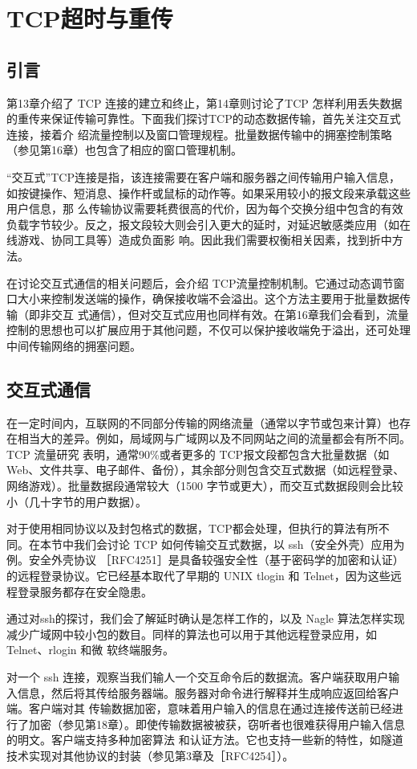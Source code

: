 \chapter{TCP超时与重传}
\section{引言}
第13章介绍了 TCP 连接的建立和终止，第14章则讨论了TCP 怎样利用丢失数据的重传来保证传输可靠性。下面我们探讨TCP的动态数据传输，首先关注交互式连接，接着介
绍流量控制以及窗口管理规程。批量数据传输中的拥塞控制策略（参见第16章）也包含了相应的窗口管理机制。

“交互式”TCP连接是指，该连接需要在客户端和服务器之间传输用户输入信息，如按键操作、短消息、操作杆或鼠标的动作等。如果采用较小的报文段来承载这些用户信息，那
么传输协议需要耗费很高的代价，因为每个交换分组中包含的有效负载字节较少。反之，报文段较大则会引入更大的延时，对延迟敏感类应用（如在线游戏、协同工具等）造成负面影
响。因此我们需要权衡相关因素，找到折中方法。

在讨论交互式通信的相关问题后，会介绍 TCP流量控制机制。它通过动态调节窗口大小来控制发送端的操作，确保接收端不会溢出。这个方法主要用于批量数据传输（即非交互
式通信），但对交互式应用也同样有效。在第16章我们会看到，流量控制的思想也可以扩展应用于其他问题，不仅可以保护接收端免于溢出，还可处理中间传输网络的拥塞问题。
\section{交互式通信}

在一定时间内，互联网的不同部分传输的网络流量（通常以字节或包来计算）也存在相当大的差异。例如，局域网与广域网以及不同网站之间的流量都会有所不同。TCP 流量研究
表明，通常90\%或者更多的 TCP报文段都包含大批量数据（如Web、文件共享、电子邮件、备份），其余部分则包含交互式数据（如远程登录、网络游戏）。批量数据段通常较大（1500
字节或更大），而交互式数据段则会比较小（几十字节的用户数据）。

对于使用相同协议以及封包格式的数据，TCP都会处理，但执行的算法有所不同。在本节中我们会讨论 TCP 如何传输交互式数据，以 ssh（安全外壳）应用为例。安全外壳协议
［RFC4251］是具备较强安全性（基于密码学的加密和认证）的远程登录协议。它已经基本取代了早期的 UNIX tlogin 和 Telnet，因为这些远程登录服务都存在安全隐患。

通过对ssh的探讨，我们会了解延时确认是怎样工作的，以及 Nagle 算法怎样实现减少广域网中较小包的数目。同样的算法也可以用于其他远程登录应用，如 Telnet、rlogin 和微
软终端服务。

对一个 ssh 连接，观察当我们输人一个交互命令后的数据流。客户端获取用户输入信息，然后将其传给服务器端。服务器对命令进行解释并生成响应返回给客户端。客户端对其
传输数据加密，意味着用户输入的信息在通过连接传送前已经进行了加密（参见第18章）。即使传输数据被被获，窃听者也很难获得用户输入信息的明文。客户端支持多种加密算法
和认证方法。它也支持一些新的特性，如隧道技术实现对其他协议的封装（参见第3章及［RFC4254］）。

